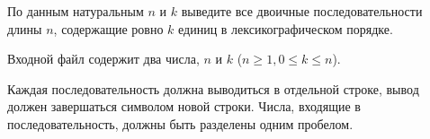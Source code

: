 По данным натуральным $n$ и $k$ выведите все двоичные последовательности длины $n$, содержащие ровно $k$ единиц в лексикографическом порядке.

\InputFile

Входной файл содержит два числа, $n$ и $k$ ($n \ge 1, 0 \le k \le n$).

\OutputFile

Каждая последовательность должна выводиться в отдельной строке, вывод должен завершаться символом новой строки.
Числа, входящие в последовательность, должны быть разделены одним пробелом.
